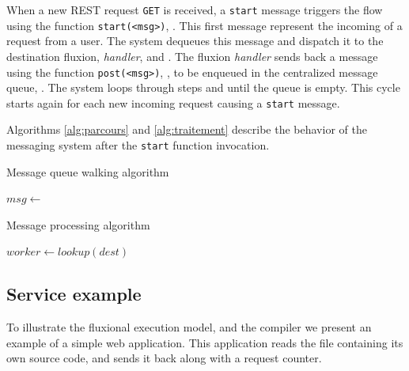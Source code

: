 When a new REST request \texttt{GET} is received, a \texttt{start} message triggers the flow using the function \texttt{start(<msg>)}, .
This first message represent the incoming of a request from a user.
The system dequeues this message and dispatch it to the destination fluxion, \textit{handler},  and .
The fluxion \textit{handler} sends back a message using the function \texttt{post(<msg>)}, , to be enqueued in the centralized message queue, .
The system loops through steps  and  until the queue is empty.
This cycle starts again for each new incoming request causing a \texttt{start} message.

Algorithms \ref{alg:parcours} and \ref{alg:traitement} describe the behavior of the messaging system after the \texttt{start} function invocation.

\begin{algorithm}
\caption{Message queue walking algorithm}
\label{alg:parcours}
\begin{algorithmic}
\State $msg \gets$  
\State {}
\EndWhile
\EndFunction
\end{algorithmic}
\end{algorithm}

\begin{algorithm}
\caption{Message processing algorithm}
\label{alg:traitement}
\begin{algorithmic}
\State $worker \gets lookup(dest)$
\State {} 
\EndFor
\EndFunction
\end{algorithmic}
\end{algorithm}

\subsection{Service example}

To illustrate the fluxional execution model, and the compiler we present an example of a simple web application.
This application reads the file containing its own source code, and sends it back along with a request counter.

